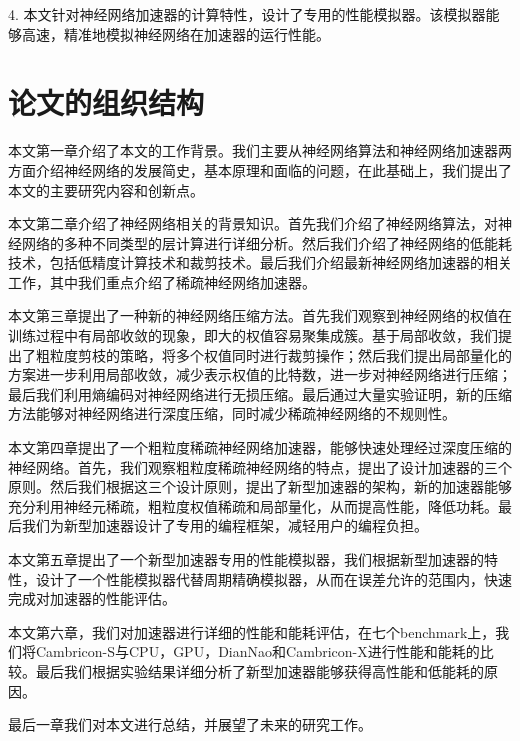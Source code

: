 4. 本文针对神经网络加速器的计算特性，设计了专用的性能模拟器。该模拟器能够高速，精准地模拟神经网络在加速器的运行性能。

\section{论文的组织结构}
本文第一章介绍了本文的工作背景。我们主要从神经网络算法和神经网络加速器两方面介绍神经网络的发展简史，基本原理和面临的问题，在此基础上，我们提出了本文的主要研究内容和创新点。

本文第二章介绍了神经网络相关的背景知识。首先我们介绍了神经网络算法，对神经网络的多种不同类型的层计算进行详细分析。然后我们介绍了神经网络的低能耗技术，包括低精度计算技术和裁剪技术。最后我们介绍最新神经网络加速器的相关工作，其中我们重点介绍了稀疏神经网络加速器。

本文第三章提出了一种新的神经网络压缩方法。首先我们观察到神经网络的权值在训练过程中有局部收敛的现象，即大的权值容易聚集成簇。基于局部收敛，我们提出了粗粒度剪枝的策略，将多个权值同时进行裁剪操作；然后我们提出局部量化的方案进一步利用局部收敛，减少表示权值的比特数，进一步对神经网络进行压缩；最后我们利用熵编码对神经网络进行无损压缩。最后通过大量实验证明，新的压缩方法能够对神经网络进行深度压缩，同时减少稀疏神经网络的不规则性。

本文第四章提出了一个粗粒度稀疏神经网络加速器，能够快速处理经过深度压缩的神经网络。首先，我们观察粗粒度稀疏神经网络的特点，提出了设计加速器的三个原则。然后我们根据这三个设计原则，提出了新型加速器的架构，新的加速器能够充分利用神经元稀疏，粗粒度权值稀疏和局部量化，从而提高性能，降低功耗。最后我们为新型加速器设计了专用的编程框架，减轻用户的编程负担。

本文第五章提出了一个新型加速器专用的性能模拟器，我们根据新型加速器的特性，设计了一个性能模拟器代替周期精确模拟器，从而在误差允许的范围内，快速完成对加速器的性能评估。

本文第六章，我们对加速器进行详细的性能和能耗评估，在七个benchmark上，我们将Cambricon-S与CPU，GPU，DianNao和Cambricon-X进行性能和能耗的比较。最后我们根据实验结果详细分析了新型加速器能够获得高性能和低能耗的原因。

最后一章我们对本文进行总结，并展望了未来的研究工作。
